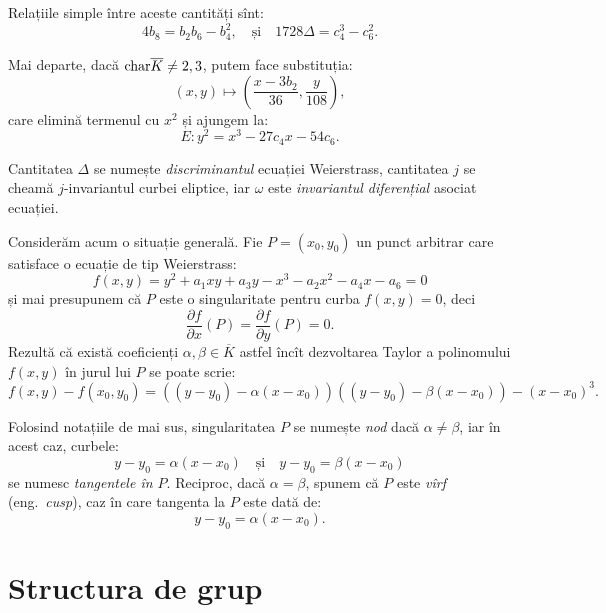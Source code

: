 Relațiile simple între aceste cantități sînt:
\[
    4b_8 = b_2b_6 - b_4^2, \quad \text{și} \quad 1728\Delta = c_4^3 - c_6^2.
\]

Mai departe, dacă $ \mathrm{char}\overline{K} \neq 2, 3 $, putem face substituția:
\[
    (x, y) \mapsto \left( \dfrac{x - 3b_2}{36}, \dfrac{y}{108} \right),
\]
care elimină termenul cu $ x^2 $ și ajungem la:
\[
      E : y^2 = x^3 - 27c_4x - 54c_6.
\]

\begin{definition}\label{def:invarianti-weierstrass}
    Cantitatea $ \Delta $ se numește \emph{discriminantul} ecuației Weierstrass,
    cantitatea $ j $ se cheamă $ j $-invariantul curbei eliptice, iar
    $ \omega $ este \emph{invariantul diferențial} asociat ecuației.
\end{definition}

Considerăm acum o situație generală. Fie $ P = (x_0, y_0) $ un punct arbitrar care
satisface o ecuație de tip Weierstrass:
\[
    f(x, y) = y^2 + a_1 xy + a_3 y - x^3 - a_2x^2 - a_4 x - a_6 = 0
\]
și mai presupunem că $ P $ este o singularitate pentru curba $ f(x, y) = 0 $, deci
\[
    \dfrac{\partial f}{\partial x}(P) = \dfrac{\partial f}{\partial y}(P) = 0.
\]
Rezultă că există coeficienți $ \alpha, \beta \in \overline{K} $ astfel încît
dezvoltarea Taylor a polinomului $ f(x, y) $ în jurul lui $ P $ se poate scrie:
\[
    f(x, y) - f(x_0, y_0) = ((y - y_0) - \alpha(x - x_0))((y - y_0) - \beta(x - x_0)) - %
    (x - x_0)^3.
\]

\begin{definition}\label{def:nod}
    Folosind notațiile de mai sus, singularitatea $ P $ se numește \emph{nod} dacă
    $ \alpha \neq \beta $, iar în acest caz, curbele:
    \[
        y - y_0 = \alpha(x - x_0) \quad \text{și} \quad y - y_0 = \beta(x - x_0)
    \]
    se numesc \emph{tangentele în $ P $}. Reciproc, dacă $ \alpha = \beta $,
    spunem că $ P $ este \emph{vîrf} (eng.\ \textit{cusp}), caz în care
    tangenta la $ P $ este dată de:
    \[
        y - y_0 = \alpha(x - x_0).
    \]
\end{definition}

\section{Structura de grup}

